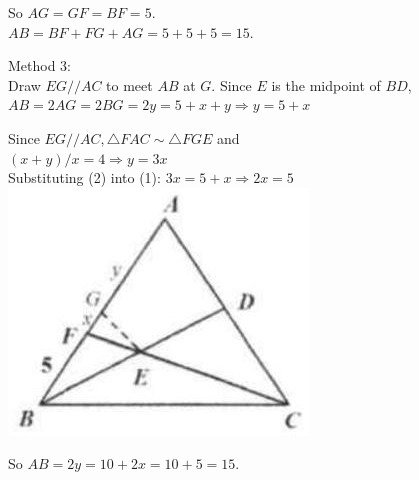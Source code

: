 \documentclass{article}
\begin{document}
So \(A G=G F=B F=5\).\\
\(A B=B F+F G+A G=5+5+5=15\).

Method 3:\\
Draw \(E G / / A C\) to meet \(A B\) at \(G\). Since \(E\) is the midpoint of \(B D\),\\
\(A B=2 A G=2 B G=2 y=5+x+y \Rightarrow y=5+x\)

Since \(E G / / A C, \triangle F A C \sim \triangle F G E\) and\\
\((x+y) / x=4 \Rightarrow y=3 x\)\\
Substituting (2) into (1): \(3 x=5+x \Rightarrow 2 x=5\)\\
\centering
\includegraphics[width=\textwidth]{images/103(6).jpg}

So \(A B=2 y=10+2 x=10+5=15\).
\end{document}

